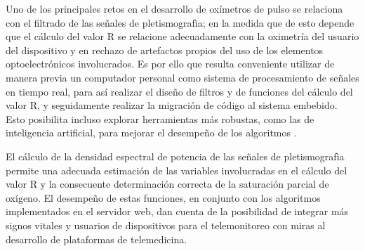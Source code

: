 \documentclass[journal]{IEEEtran}
\begin{document}
Uno de los principales retos en el desarrollo de oxímetros de pulso se relaciona con el filtrado de las señales de pletismografìa; en la medida que de esto depende que el cálculo del valor R se relacione adecuadamente con la oximetría del usuario del dispositivo y en rechazo de artefactos propios del uso de los elementos optoelectrónicos involucrados. Es por ello que resulta conveniente utilizar de manera previa un computador personal como sistema de procesamiento de señales en tiempo real, para así realizar el diseño de filtros y de funciones del cálculo del valor R, y seguidamente realizar la migración de código al sistema embebido. Esto posibilita incluso explorar herramientas más robustas, como las de inteligencia artificial, para mejorar el desempeño de los algoritmos \cite{E_spo2_wrist_machine_learning}.

El cálculo de la densidad espectral de potencia de las señales de pletismografìa permite una adecuada estimación de las variables involucradas en el cálculo del valor R y la consecuente determinación correcta de la saturación parcial de oxígeno. El desempeño de estas funciones, en conjunto con los algoritmos implementados en el servidor web, dan cuenta de la posibilidad de integrar más signos vitales y usuarios de dispositivos para el telemonitoreo con miras al desarrollo de plataformas de telemedicina.




 








\end{document}
